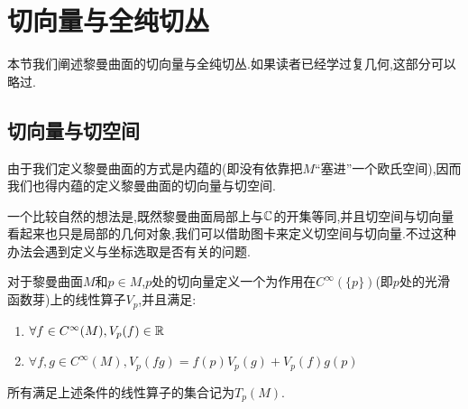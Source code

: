 \section{切向量与全纯切丛}
本节我们阐述黎曼曲面的切向量与全纯切丛.如果读者已经学过复几何,这部分可以略过.
\subsection*{切向量与切空间}
由于我们定义黎曼曲面的方式是内蕴的(即没有依靠把$M$“塞进”一个欧氏空间),因而我们也得内蕴的定义黎曼曲面的切向量与切空间.

一个比较自然的想法是,既然黎曼曲面局部上与$\mathbb{C}$的开集等同,并且切空间与切向量看起来也只是局部的几何对象,我们可以借助图卡来定义切空间与切向量.不过这种办法会遇到定义与坐标选取是否有关的问题.

\begin{definition}
	对于黎曼曲面$M$和$p\in M$,$p$处的切向量定义一个为作用在$C^\infty(\{p\})$(即$p$处的光滑函数芽)上的线性算子$V_p$,并且满足:
	\begin{enumerate}
	\item $\forall f \in C^\infty(M),V_p(f)\in \mathbb{R}$
	\item $\forall f,g \in C^\infty(M),V_p(fg)=f(p)V_p(g)+V_p(f)g(p)$
	\end{enumerate}
	所有满足上述条件的线性算子的集合记为$T_p(M)$.
\end{definition}

